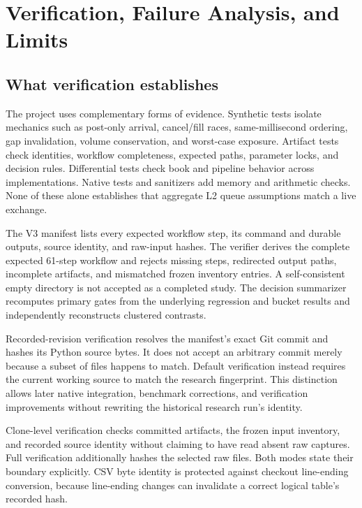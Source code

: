\section{Verification, Failure Analysis, and Limits}

\subsection{What verification establishes}

The project uses complementary forms of evidence. Synthetic tests isolate
mechanics such as post-only arrival, cancel/fill races, same-millisecond
ordering, gap invalidation, volume conservation, and worst-case exposure.
Artifact tests check identities, workflow completeness, expected paths,
parameter locks, and decision rules. Differential tests check book and
pipeline behavior across implementations. Native tests and sanitizers add
memory and arithmetic checks. None of these alone establishes that aggregate
L2 queue assumptions match a live exchange.

The V3 manifest lists every expected workflow step, its command and durable
outputs, source identity, and raw-input hashes. The verifier derives the
complete expected 61-step workflow and rejects missing steps, redirected
output paths, incomplete artifacts, and mismatched frozen inventory entries.
A self-consistent empty directory is not accepted as a completed study. The
decision summarizer recomputes primary gates from the underlying regression
and bucket results and independently reconstructs clustered contrasts.

Recorded-revision verification resolves the manifest's exact Git commit and
hashes its Python source bytes. It does not accept an arbitrary commit merely
because a subset of files happens to match. Default verification instead
requires the current working source to match the research fingerprint. This
distinction allows later native integration, benchmark corrections, and
verification improvements without rewriting the historical research run's
identity.

Clone-level  verification checks committed artifacts,
the frozen input inventory, and recorded source identity without claiming to
have read absent raw captures. Full verification additionally hashes the
selected raw files. Both modes state their boundary explicitly. CSV byte
identity is protected against checkout line-ending conversion, because
line-ending changes can invalidate a correct logical table's recorded hash.

